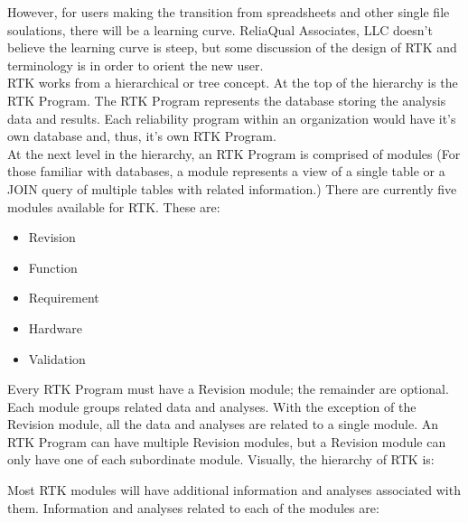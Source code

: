 \documentclass[twoside,12pt,letterpaper,openright]{book}
\begin{document}
\noindent However, for users making the transition from spreadsheets and other
single file soulations, there will be a learning curve.  ReliaQual Associates,
LLC doesn't believe the learning curve is steep, but some discussion of the
design of RTK and terminology is in order to orient the new user.
\\

\noindent RTK works from a hierarchical or tree concept.  At the top of the
hierarchy is the RTK Program.  The RTK Program represents the database storing
the analysis data and results.  Each reliability program within an organization
would have it's own database and, thus, it's own RTK Program. \\

\noindent At the next level in the hierarchy, an RTK Program is comprised of
modules (For those familiar with databases, a module represents a view of a
single table or a JOIN query of multiple tables with related information.)
There are currently five modules available for RTK.  These are:
\\

\begin{itemize}
    \item Revision
    \item Function
    \item Requirement
    \item Hardware
    \item Validation
\end{itemize}

\noindent Every RTK Program must have a Revision module; the remainder are
optional.
\\

\noindent Each module groups related data and analyses.  With the exception of
the Revision module, all the data and analyses are related to a single module.
An RTK Program can have multiple Revision modules, but a Revision module can
only have one of each subordinate module.  Visually, the hierarchy of RTK is:
\\


\medskip
\noindent Most RTK modules will have additional information and analyses
associated with them.  Information and analyses related to each of the modules
are:
\end{document}
